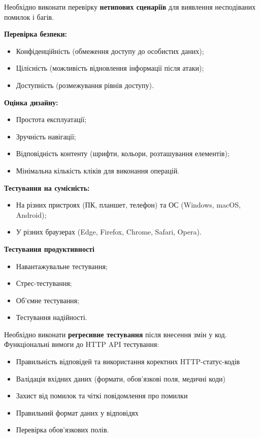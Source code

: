 \documentclass{article}
\begin{document}
Необхідно виконати перевірку \textbf{нетипових сценаріїв} для виявлення несподіваних помилок і багів.

\textbf{Перевірка безпеки:}
\begin{itemize}
    \item Конфіденційність (обмеження доступу до особистих даних);
    \item Цілісність (можливість відновлення інформації після атаки);
    \item Доступність (розмежування рівнів доступу).
\end{itemize}

\textbf{Оцінка дизайну:}
\begin{itemize}
    \item Простота експлуатації;
    \item Зручність навігації;
    \item Відповідність контенту (шрифти, кольори, розташування елементів);
    \item Мінімальна кількість кліків для виконання операцій.
\end{itemize}

\textbf{Тестування на сумісність:}
\begin{itemize}
    \item На різних пристроях (ПК, планшет, телефон) та ОС (Windows, macOS, Android);
    \item У різних браузерах (Edge, Firefox, Chrome, Safari, Opera).
\end{itemize}

\textbf{Тестування продуктивності}
\begin{itemize}
    \item Навантажувальне тестування;
    \item Стрес-тестування;
    \item Об’ємне тестування;
    \item Тестування надійності.
\end{itemize}

Необхідно виконати \textbf{регресивне тестування} після внесення змін у код.
Функціональні вимоги до HTTP API тестування:

\begin{itemize}
    \item Правильність відповідей та використання коректних HTTP-статус-кодів
    \item Валідація вхідних даних (формати, обов’язкові поля, медичні коди)
    \item Захист від помилок та чіткі повідомлення про помилки
    \item Правильний формат даних у відповідях
    \item Перевірка обов’язкових полів.
\end{itemize}
\end{document}
